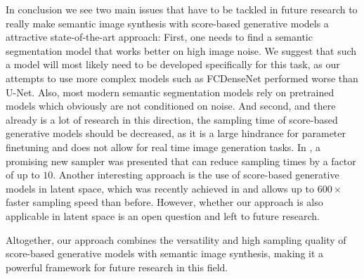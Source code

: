 In conclusion we see two main issues that have to be tackled in future research to really make semantic image synthesis with score-based generative models a attractive state-of-the-art approach: First, one needs to find a semantic segmentation model that works better on high image noise. We suggest that such a model will most likely need to be developed specifically for this task, as our attempts to use more complex models such as FCDenseNet \cite{densenet} performed worse than U-Net. Also, most modern semantic segmentation models rely on pretrained models which obviously are not conditioned on noise. And second, and there already is a lot of research in this direction, the sampling time of score-based generative models should be decreased, as it is a large hindrance for parameter finetuning and does not allow for real time image generation tasks. In \cite{gotta_go_fast}, a promising new sampler was presented that can reduce sampling times by a factor of up to $10$. Another interesting approach is the use of score-based generative models in latent space, which was recently achieved in \cite{latent} and allows up to $600\times$ faster sampling speed than before. However, whether our approach is also applicable in latent space is an open question and left to future research.

Altogether, our approach combines the versatility and high sampling quality of score-based generative models with semantic image synthesis, making it a powerful framework for future research in this field.



